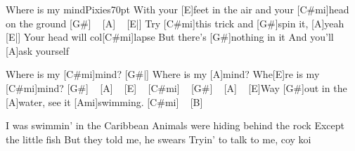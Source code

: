 \begin{song}{Where is my mind}{Pixies}{70pt}
%
With your [E]feet in the air and your [C#mi]head on the ground [G#] ~ [A] ~
[E|]{} Try [C#mi]this trick and [G#]spin it, [A]yeah
[E|]{} Your head will col[C#mi]lapse
But there's [G#]nothing in it
And you'll [A]ask yourself

\chorus%
[E|]{} Where is my [C#mi]mind?
[G#|]{} Where is my [A]mind?
Whe[E]re is my [C#mi]mind? [G#] ~ [A] ~ [E] ~ [C#mi] ~ [G#] ~ [A] ~
[E]Way [G#]out in the [A]water, see it [Ami]swimming. [C#mi] ~ [B] ~

%
I was swimmin' in the Caribbean
Animals were hiding behind the rock
Except the little fish
But they told me, he swears
Tryin' to talk to me, coy koi
\repchor

\repchor

\end{song}
